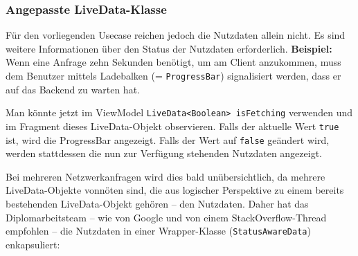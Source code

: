 \hypertarget{angepasste-livedata-klasse}{%
\subsubsection{Angepasste
LiveData-Klasse}\label{angepasste-livedata-klasse}}

Für den vorliegenden Usecase reichen jedoch die Nutzdaten allein nicht.
Es sind weitere Informationen über den Status der Nutzdaten
erforderlich. \textbf{Beispiel:} Wenn eine Anfrage zehn Sekunden
benötigt, um am Client anzukommen, muss dem Benutzer mittels Ladebalken
(= \texttt{ProgressBar}) signalisiert werden, dass er auf das Backend zu
warten hat.

Man könnte jetzt im ViewModel
\texttt{LiveData\textless{}Boolean\textgreater{}\ isFetching} verwenden
und im Fragment dieses LiveData-Objekt observieren. Falls der aktuelle
Wert \texttt{true} ist, wird die ProgressBar angezeigt. Falls der Wert
auf \texttt{false} geändert wird, werden stattdessen die nun zur
Verfügung stehenden Nutzdaten angezeigt.

Bei mehreren Netzwerkanfragen wird dies bald unübersichtlich, da mehrere
LiveData-Objekte vonnöten sind, die aus logischer Perspektive zu einem
bereits bestehenden LiveData-Objekt gehören -- den Nutzdaten. Daher hat
das Diplomarbeitsteam -- wie von Google \cite{google-wrapper} und von
einem StackOverflow-Thread \cite{so-wrapper} empfohlen -- die Nutzdaten
in einer Wrapper-Klasse (\texttt{StatusAwareData}) enkapsuliert:


